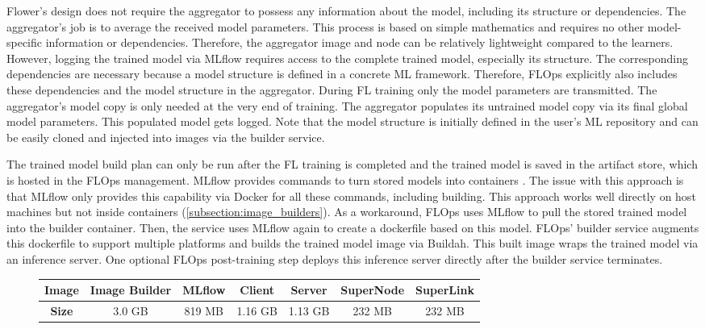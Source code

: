Flower's design does not require the aggregator to possess any information about the model, including its structure or dependencies.
The aggregator's job is to average the received model parameters.
This process is based on simple mathematics and requires no other model-specific information or dependencies.
Therefore, the aggregator image and node can be relatively lightweight compared to the learners.
However, logging the trained model via MLflow requires access to the complete trained model, especially its structure.
The corresponding dependencies are necessary because a model structure is defined in a concrete ML framework.
Therefore, FLOps explicitly also includes these dependencies and the model structure in the aggregator.
During FL training only the model parameters are transmitted.
The aggregator's model copy is only needed at the very end of training.
The aggregator populates its untrained model copy via its final global model parameters.
This populated model gets logged.
Note that the model structure is initially defined in the user's ML repository and can be easily cloned and injected into images via the builder service.

The trained model build plan can only be run after the FL training is completed and the trained model is saved in the artifact store, which is hosted in the FLOps management.
MLflow provides commands to turn stored models into containers \cite{docs:mlfow_docker_cmds}.
The issue with this approach is that MLflow only provides this capability via Docker for all these commands, including building.
This approach works well directly on host machines but not inside containers (\ref{subsection:image_builders}).
As a workaround, FLOps uses MLflow to pull the stored trained model into the builder container.
Then, the service uses MLflow again to create a dockerfile based on this model.
FLOps' builder service augments this dockerfile to support multiple platforms and builds the trained model image via Buildah.
This built image wraps the trained model via an inference server.
One optional FLOps post-training step deploys this inference server directly after the builder service terminates.

\begin{figure}[b]
    \begin{changemargin}{0cm}{0cm}
        \centering
        \begin{tabular}{|c||c|c|c|c|c|c|}
            \hline
                \textbf{Image} & Image Builder & MLflow & Client & Server & SuperNode & SuperLink \\
            \hline
                \textbf{Size} & 3.0 GB & 819 MB & 1.16 GB & 1.13 GB & 232 MB & 232 MB
            \\
            \hline
        \end{tabular}
        \label{table:relevant_image_sizes_for_building}
    \end{changemargin}
\end{figure}

